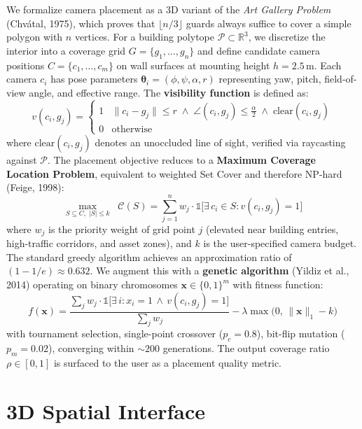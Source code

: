 \documentclass[9pt,letterpaper,twocolumn]{extarticle}
\begin{document}
We formalize camera placement as a 3D variant of the \emph{Art Gallery Problem} (Chv\'{a}tal, 1975), which proves that $\lfloor n/3 \rfloor$ guards always suffice to cover a simple polygon with $n$ vertices. For a building polytope $\mathcal{P} \subset \mathbb{R}^3$, we discretize the interior into a coverage grid $G = \{g_1, \ldots, g_n\}$ and define candidate camera positions $C = \{c_1, \ldots, c_m\}$ on wall surfaces at mounting height $h = 2.5$\,m. Each camera $c_i$ has pose parameters $\boldsymbol{\theta}_i = (\phi, \psi, \alpha, r)$ representing yaw, pitch, field-of-view angle, and effective range. The \textbf{visibility function} is defined as:
%
\begin{equation}
v(c_i, g_j) = \begin{cases} 1 & \|c_i - g_j\| \leq r \;\wedge\; \angle(c_i, g_j) \leq \frac{\alpha}{2} \;\wedge\; \text{clear}(c_i, g_j) \\ 0 & \text{otherwise} \end{cases}
\end{equation}
%
where $\text{clear}(c_i, g_j)$ denotes an unoccluded line of sight, verified via raycasting against $\mathcal{P}$. The placement objective reduces to a \textbf{Maximum Coverage Location Problem}, equivalent to weighted Set Cover and therefore NP-hard (Feige, 1998):
%
\begin{equation}
\max_{S \subseteq C,\; |S| \leq k} \;\; \mathcal{C}(S) = \sum_{j=1}^{n} w_j \cdot \mathbb{1}\Big[\exists\, c_i \in S : v(c_i, g_j) = 1\Big]
\end{equation}
%
where $w_j$ is the priority weight of grid point $j$ (elevated near building entries, high-traffic corridors, and asset zones), and $k$ is the user-specified camera budget. The standard greedy algorithm achieves an approximation ratio of $(1 - 1/e) \approx 0.632$. We augment this with a \textbf{genetic algorithm} (Yildiz et al., 2014) operating on binary chromosomes $\mathbf{x} \in \{0,1\}^m$ with fitness function:
%
\begin{equation}
f(\mathbf{x}) = \frac{\sum_{j} w_j \cdot \mathbb{1}\big[\exists\, i : x_i = 1 \,\wedge\, v(c_i, g_j) = 1\big]}{\sum_{j} w_j} - \lambda \max\big(0,\, \|\mathbf{x}\|_1 - k\big)
\end{equation}
%
with tournament selection, single-point crossover ($p_c = 0.8$), bit-flip mutation ($p_m = 0.02$), converging within ${\sim}200$ generations. The output coverage ratio $\rho \in [0,1]$ is surfaced to the user as a placement quality metric.

\section*{3D Spatial Interface}
\end{document}
